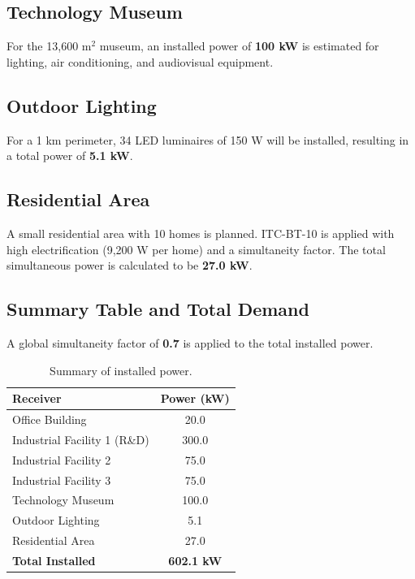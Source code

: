 \documentclass[12pt, a4paper]{report}
\begin{document}
\subsection{Technology Museum}
For the 13,600 $\text{m}^2$ museum, an installed power of \textbf{100 kW} is estimated for lighting, air conditioning, and audiovisual equipment.

\subsection{Outdoor Lighting}
For a 1 km perimeter, 34 LED luminaires of 150 W will be installed, resulting in a total power of \textbf{5.1 kW}.

\subsection{Residential Area}
A small residential area with 10 homes is planned. ITC-BT-10 is applied with high electrification (9,200 W per home) and a simultaneity factor. The total simultaneous power is calculated to be \textbf{27.0 kW}.

\subsection{Summary Table and Total Demand}
A global simultaneity factor of \textbf{0.7} is applied to the total installed power.

\begin{table}[htbp]
    \centering
    \caption{Summary of installed power.}
    \label{tab:potencias}
    \begin{tabular}{@{}lc@{}}
        \toprule
        \textbf{Receiver} & \textbf{Power (kW)} \\ \midrule
        Office Building & 20.0 \\
        Industrial Facility 1 (R\&D) & 300.0 \\
        Industrial Facility 2 & 75.0 \\
        Industrial Facility 3 & 75.0 \\
        Technology Museum & 100.0 \\
        Outdoor Lighting & 5.1 \\
        Residential Area & 27.0 \\ \midrule
        \textbf{Total Installed} & \textbf{602.1 kW} \\ \bottomrule
    \end{tabular}
\end{table}
\end{document}
